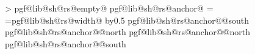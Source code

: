 {{                        \fi%
                    \fi%
            \repeatpgfmathloop%
            \pgfextract@process{}%
            \addtosavedmacro\northeast%
            \pgfextract@process{}%
            \addtosavedmacro\southwest%
            \pgfextract@process{}%
            \addtosavedmacro\centerpoint%
            \pgfmathloop%
                \ifnum\pgfmathcounter>\parts%
                \else%
                    \pgf@lib@sh@getalpha\pgf@lib@sh@rs@number{\pgfmathcounter}%
                    \expandafter\ifx\csname pgf@lib@sh@rs@empty@\pgf@lib@sh@rs@number\endcsname\pgfutil@empty%
                    \else%
                        \csname pgf@lib@sh@rs@anchor@\pgf@lib@sh@rs@number\endcsname%
                        \pgf@xa=\pgf@x%
                        \pgf@xb=\csname pgf@lib@sh@rs@width@\pgf@lib@sh@rs@number\endcsname\relax%
                        \advance\pgf@xa by0.5\pgf@xb%
                        \expandafter\pgfextract@process\csname pgf@lib@sh@rs@anchor@\pgf@lib@sh@rs@number @south\endcsname{%
                            \southwest%
                            \pgf@x=\pgf@xa%
                        }%
                        \expandafter\pgfextract@process\csname pgf@lib@sh@rs@anchor@\pgf@lib@sh@rs@number @north\endcsname{%
                            \northeast%
                            \pgf@x=\pgf@xa%
                        }%
                        \expandafter\addtosavedmacro\csname pgf@lib@sh@rs@anchor@\pgf@lib@sh@rs@number @north\endcsname%
                        \expandafter\addtosavedmacro\csname pgf@lib@sh@rs@anchor@\pgf@lib@sh@rs@number @south\endcsname%
}}
